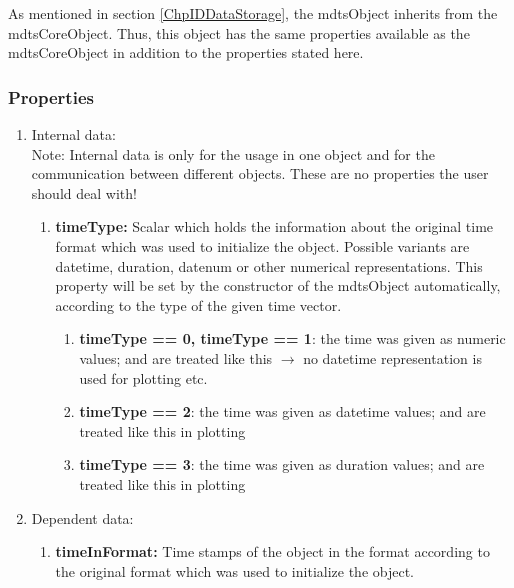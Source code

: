\documentclass[a4]{scrreprt}
\begin{document}
As mentioned in section \ref{ChpIDDataStorage}, the mdtsObject inherits from the mdtsCoreObject. Thus, this object has the same properties available as the mdtsCoreObject in addition to the properties stated here.

\subsubsection{Properties}

\begin{enumerate}
	
	\item Internal data:\\
	Note: Internal data is only for the usage in one object and for the communication between different objects. These are no properties the user should deal with!
	
		\begin{enumerate}
			
			\item \textbf{timeType:} Scalar which holds the information about the original time format which was used to initialize the object. Possible variants are datetime, duration, datenum or other numerical representations. This property will be set by the constructor of the mdtsObject automatically, according to the type of the given time vector.
			\begin{enumerate}
				\item \textbf{timeType == 0, timeType == 1}: the time was given as numeric values; and are treated like this $\rightarrow$ no datetime representation is used for plotting etc.
				\item \textbf{timeType == 2}: the time was given as datetime values; and are treated like this in plotting
				\item \textbf{timeType == 3}: the time was given as duration values; and are treated like this in plotting
			\end{enumerate}		
		\end{enumerate}
	
	\item Dependent data:	
		\begin{enumerate}	
			\item \textbf{timeInFormat:} Time stamps of the object in the format according to the original format which was used to initialize the object. 
		\end{enumerate}
	
\end{enumerate}
\end{document}
